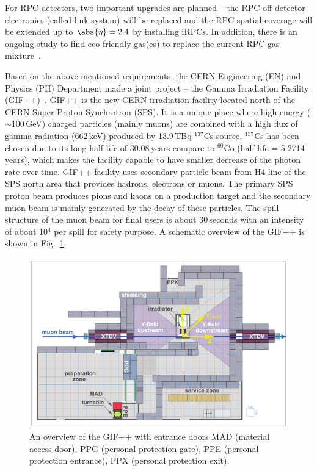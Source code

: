 \begin{itemize}
For RPC detectors, two important upgrades are planned – the RPC off-detector electronics (called link system) will be replaced and the RPC spatial coverage will be extended up to $\abs{\eta} = 2.4$ by installing iRPCs. In addition, there is an ongoing study to find eco-friendly gas(es) to replace the current RPC gas mixture~\cite{phase2}. 
\end{itemize}
Based on the above-mentioned requirements, the CERN Engineering (EN) and Physics (PH) Department made a joint project – the Gamma Irradiation Facility (GIF++)~\cite{JAKEL2014}. GIF++ is the new CERN irradiation facility located north of the CERN Super Proton Synchrotron (SPS). It is a unique place where high energy ($\sim$100\,GeV) charged particles (mainly muons) are combined with a high flux of gamma radiation (662\,keV) produced by 13.9\,TBq $^{137}$Cs source. $^{137}$Cs has been chosen due to its long half-life of 30.08\,years compare to $^{60}$Co (half-life = 5.2714\,years), which makes the facility capable to have smaller decrease of the photon rate over time. GIF++ facility uses secondary particle beam from H4 line of the SPS north area that provides hadrons, electrons or muons. The primary SPS proton beam produces pions and kaons on a production target and the secondary muon beam is mainly generated by the decay of these particles. The spill structure of the muon beam for final users is about 30\,seconds with an intensity of about 10$^4$ per spill for safety purpose\cite{Pfeiffer:2016hnl}. A schematic overview of the GIF++ is shown in Fig.~\ref{fig:gif}.
\begin{figure}[htp]
\centering
\includegraphics[scale=0.35]{fig/wincc/GIF.pdf}
  \caption{An overview of the GIF++ with entrance doors MAD (material access door), PPG (personal protection gate), PPE (personal protection entrance), PPX (personal protection exit).}
\label{fig:gif}
\end{figure}
